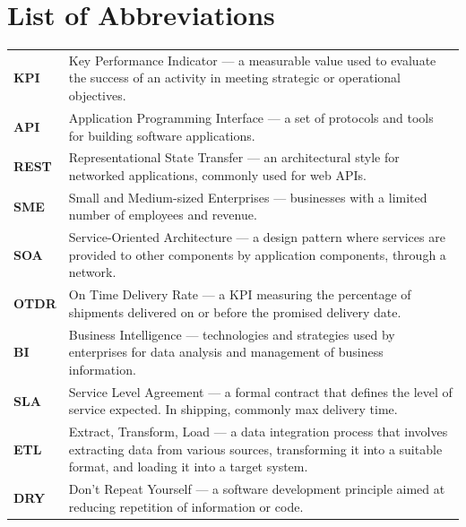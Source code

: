 \documentclass{imc-inf}
\begin{document}
%
\listoftables
\clearpage

%
\listoffigures

\chapter*{List of Abbreviations}
\begin{tabular}{@{}p{3cm}p{10cm}@{}}
  \textbf{KPI}  & Key Performance Indicator — a measurable value used to evaluate the success of an activity in meeting strategic or operational objectives.                                             \\[6pt]
  \textbf{API}  & Application Programming Interface — a set of protocols and tools for building software applications.                                                                                   \\[6pt]
  \textbf{REST} & Representational State Transfer — an architectural style for networked applications, commonly used for web APIs.                                                                       \\[6pt]
  \textbf{SME}  & Small and Medium-sized Enterprises — businesses with a limited number of employees and revenue.                                                                                        \\[6pt]
  \textbf{SOA}  & Service-Oriented Architecture — a design pattern where services are provided to other components by application components, through a network.                                         \\[6pt]
  \textbf{OTDR} & On Time Delivery Rate — a KPI measuring the percentage of shipments delivered on or before the promised delivery date.                                                                 \\[6pt]
  \textbf{BI}   & Business Intelligence — technologies and strategies used by enterprises for data analysis and management of business information.                                                      \\[6pt]
  \textbf{SLA}  & Service Level Agreement — a formal contract that defines the level of service expected. In shipping, commonly max delivery time.                                                       \\[6pt]
  \textbf{ETL}  & Extract, Transform, Load — a data integration process that involves extracting data from various sources, transforming it into a suitable format, and loading it into a target system. \\[6pt]
  \textbf{DRY}  & Don't Repeat Yourself — a software development principle aimed at reducing repetition of information or code.                                                                          \\[6pt]
\end{tabular}
\end{document}
